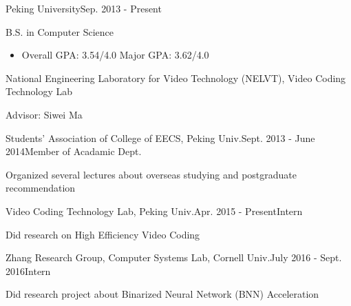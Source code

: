 \documentclass{joel_cv}
\begin{document}
\pagestyle{empty}

\begin{cvHeader} 
\end{cvHeader}

%
%

\begin{sectionContentSimple}{Peking University}{Sep. 2013 - Present}
	\item B.S. in Computer Science
	\begin{itemize}
		\item Overall GPA: 3.54/4.0 \quad Major GPA: 3.62/4.0
	\end{itemize}
	\item National Engineering Laboratory for Video Technology (NELVT), Video Coding Technology Lab
	\item Advisor: Siwei Ma
\end{sectionContentSimple}

%
%


\begin{sectionContentNormal}{Students' Association of College of EECS, Peking Univ.}{Sept. 2013 - June 2014}{Member of Acadamic Dept.}
	\item Organized several lectures about overseas studying and postgraduate recommendation
\end{sectionContentNormal}

\begin{sectionContentNormal}{Video Coding Technology Lab, Peking Univ.}{Apr. 2015 - Present}{Intern}
	\item Did research on High Efficiency Video Coding
\end{sectionContentNormal}

\begin{sectionContentNormal}{Zhang Research Group, Computer Systems Lab, Cornell Univ.}{July 2016 - Sept. 2016}{Intern}
	\item Did research project about Binarized Neural Network (BNN) Acceleration
\end{sectionContentNormal}


%
%
\end{document}
